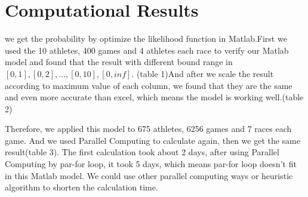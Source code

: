 \documentclass[
journal=jacsat, %
manuscript=article]{achemso}
\begin{document}
\section{Computational Results}
we get the probability by optimize the likelihood function in Matlab.First we used the 10 athletes, 400 games and 4 athletes each race to verify our Matlab model and found that the result with different bound range in $[0,1],[0,2],\ldots,[0,10],[0,inf]$. (table 1)And after we scale the result according to maximum value of each column, we found that they are the same and even more accurate than excel, which means the model is working well.(table 2)

Therefore, we applied this model to 675 athletes, 6256 games and 7 races each game. And we used Parallel Computing to calculate again, then we  get the same result(table 3). The first calculation took about 2 days, after using Parallel Computing by par-for loop, it took 5 days, which means par-for loop doesn't fit in this Matlab model. We could use other parallel computing ways or heuristic algorithm to shorten the calculation time.
\end{document}
